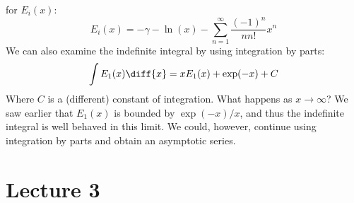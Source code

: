 \documentclass[crop=false,class=book,oneside]{standalone}
\begin{document}
            for $E_{i}(x)$:
            \begin{equation}
                E_{i}(x)=-\gamma-\ln(x)
                -\sum_{n=1}^{\infty}\frac{(-1)^{n}}{nn!}x^{n}
            \end{equation}
            We can also examine the indefinite integral by using
            integration by parts:
            \begin{equation}
                \int{E}_{1}(x)\diff{x}=
                xE_{1}(x)+\exp(-x)+C
            \end{equation}
            Where $C$ is a (different) constant of integration.
            What happens as $x\rightarrow\infty$? We saw earlier
            that $E_{1}(x)$ is bounded by
            $\exp(-x)/x$, and thus the indefinite integral is well
            behaved in this limit. We could, however, continue
            using integration by parts and obtain an asymptotic
            series.
    \section{Lecture 3}
\end{document}
